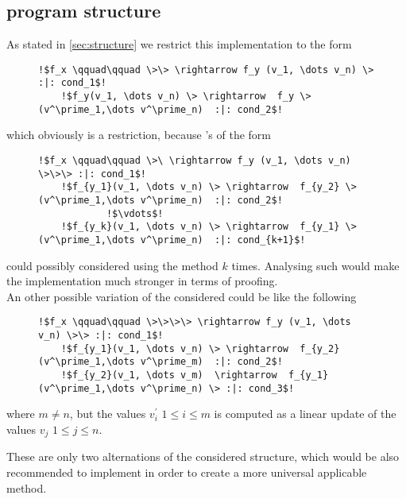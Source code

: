 \subsection{\its program structure}
\label{sec:structure-improvement}
As stated in \autoref{sec:structure} we restrict this implementation to the form 
\begin{figure}[H]
	\begin{lstlisting}[escapechar=!]
	!$f_x \qquad\qquad \>\> \rightarrow f_y (v_1, \dots v_n) \> :|: cond_1$!
	!$f_y(v_1, \dots v_n) \> \rightarrow  f_y \>(v^\prime_1,\dots v^\prime_n)  :|: cond_2$!
	\end{lstlisting}
\end{figure}
which obviously is a restriction, because \its's of the form
\begin{figure}[H]
	\begin{lstlisting}[escapechar=!]
	!$f_x \qquad\qquad \>\ \rightarrow f_y (v_1, \dots v_n) \>\>\> :|: cond_1$!
	!$f_{y_1}(v_1, \dots v_n) \> \rightarrow  f_{y_2} \>(v^\prime_1,\dots v^\prime_n)  :|: cond_2$!
			!$\vdots$!
	!$f_{y_k}(v_1, \dots v_n) \> \rightarrow  f_{y_1} \>(v^\prime_1,\dots v^\prime_n)  :|: cond_{k+1}$!
	\end{lstlisting}
\end{figure}
could possibly considered using the method $k$ times. Analysing such \its would make the implementation much stronger in terms of proofing.
\\
An other possible variation of the considered \its could be like the following
\begin{figure}[H]
	\begin{lstlisting}[escapechar=!]
	!$f_x \qquad\qquad \>\>\>\> \rightarrow f_y (v_1, \dots v_n) \>\> :|: cond_1$!
	!$f_{y_1}(v_1, \dots v_n) \> \rightarrow  f_{y_2} (v^\prime_1,\dots v^\prime_m)  :|: cond_2$!
	!$f_{y_2}(v_1, \dots v_m)  \rightarrow  f_{y_1} (v^\prime_1,\dots v^\prime_n) \> :|: cond_3$!
	\end{lstlisting}
\end{figure}
where $m \ne n$, but the values $v^\prime_i$ $1 \le i \le m$ is computed as a linear update of the values $v_j$ $1 \le j \le n$.

These are only two alternations of the considered structure, which would be also recommended to implement in order to create a more universal applicable method.

